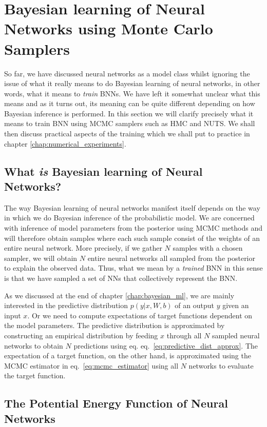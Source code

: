 \section{Bayesian learning of Neural Networks using Monte Carlo Samplers}
So far, we have discussed neural networks as a model class whilst ignoring the issue of what it really means to do Bayesian learning of neural networks, 
in other words, what it means to \textit{train} BNNs. We have left it somewhat unclear what this means and as it turns out, its meaning can be quite different depending on how Bayesian inference is performed. In this section we will clarify precisely what it means to train BNN using MCMC samplers such as HMC and NUTS. We shall then discuss practical aspects of the training which we shall put to practice in chapter \ref{chap:numerical_experiments}.

\subsection{What \textit{is} Bayesian learning of Neural Networks?}
The way Bayesian learning of neural networks manifest itself depends on the way in which we do Bayesian inference of the probabilistic model. 
We are concerned with inference of model parameters from the posterior using MCMC methods and will therefore obtain samples where each such sample
consist of the weights of an entire neural network. More precisely, if we gather $N$ samples with a chosen sampler, we will obtain $N$ entire neural networks
all sampled from the posterior to explain the observed data. Thus, what we mean by a \textit{trained} BNN in this sense is that we have
sampled a set of NNs that collectively represent the BNN. 

As we discussed at the end of chapter \ref{chap:bayesian_ml}, we are mainly interested in the predictive distribution $p(y|x, W, b)$ of an output $y$ given an input $x$. Or we need to compute expectations of target functions dependent on the model parameters. The predictive distribution is approximated by constructing an empirical distribution by feeding $x$ through all $N$ sampled neural networks to obtain $N$ predictions using eq. eq.~\eqref{eq:predictive_dist_approx}. The expectation of a target function, on the other hand, is approximated using the MCMC estimator in eq.~\eqref{eq:mcmc_estimator} using all $N$ networks to evaluate the target function.


\subsection{The Potential Energy Function of Neural Networks}

